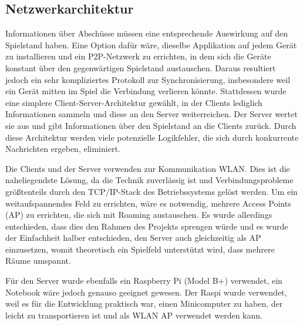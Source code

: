 \subsection{Netzwerkarchitektur}
Informationen über Abschüsse müssen eine entsprechende Auswirkung auf den Spielstand haben.
Eine Option dafür wäre, dieselbe Applikation auf jedem Gerät zu installieren und ein P2P-Netzwerk zu
errichten, in dem sich die Geräte konstant über den gegenwärtigen Spielstand austauschen.
Daraus resultiert jedoch ein sehr kompliziertes Protokoll zur Synchronisierung, insbesondere weil
ein Gerät mitten im Spiel die Verbindung verlieren könnte.
Stattdessen wurde eine simplere Client-Server-Architektur gewählt, in der Clients lediglich
Informationen sammeln und diese an den Server weiterreichen.
Der Server wertet sie aus und gibt Informationen über den Spielstand an die Clients zurück.
Durch diese Architektur werden viele potenzielle Logikfehler, die sich durch konkurrente Nachrichten
ergeben, eliminiert.

Die Clients und der Server verwenden zur Kommunikation WLAN. Dies ist die naheliegendste Lösung, da
die Technik zuverlässig ist und Verbindungsprobleme größtenteils durch den TCP/IP-Stack des
Betriebssystems gelöst werden.
Um ein weitaufspannendes Feld zu errichten, wäre es notwendig, mehrere Access Points (AP) zu
errichten, die sich mit Roaming austauschen.
Es wurde allerdings entschieden, dass dies den Rahmen des Projekts sprengen würde und es wurde der
Einfachheit halber entschieden, den Server auch gleichzeitig als AP einzusetzen, womit theoretisch
ein Spielfeld unterstützt wird, dass mehrere Räume umspannt.

Für den Server wurde ebenfalls ein Raspberry Pi (Model B+) verwendet, ein Notebook wäre jedoch
genauso geeignet gewesen.
Der Raspi wurde verwendet, weil es für die Entwicklung praktisch war, einen Minicomputer zu haben,
der leicht zu transportieren ist und als WLAN AP verwendet werden kann.
